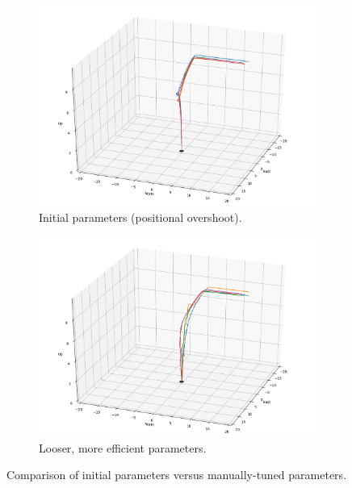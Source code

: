 \begin{figure}[ht]
    \centering
    \begin{subfigure}[b]{0.45\textwidth}
        \centering
        \includegraphics[width=\textwidth]{images/linear_land_test_initial.png}
        \caption{Initial parameters (positional overshoot).}
        \label{subfig:linear_land_test_initial}
    \end{subfigure}
    \begin{subfigure}[b]{0.45\textwidth}
        \centering
        \includegraphics[width=\textwidth]{images/linear_land_test_better.png}
        \caption{Looser, more efficient parameters.}
        \label{subfig:linear_land_test_better}
    \end{subfigure}
    \caption{Comparison of initial parameters versus manually-tuned parameters.}
    \label{fig:initial_u_pid_gains}
\end{figure}

